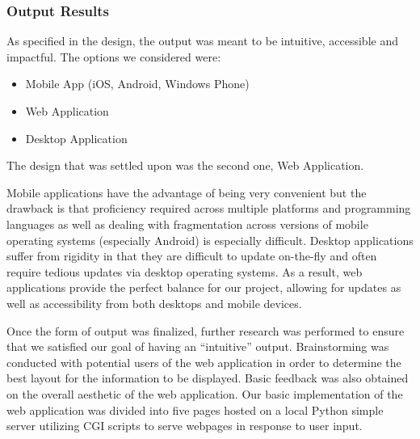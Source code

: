 \subsubsection{Output Results}

As specified in the design, the output was meant to be intuitive,
accessible and impactful. The options we considered were:

\begin{itemize}
    \item Mobile App (iOS, Android, Windows Phone)
    \item Web Application
    \item Desktop Application
\end{itemize}

The design that was settled upon was the second one, Web Application.

Mobile applications have the advantage of being very convenient but
the drawback is that proficiency required across multiple platforms
and programming languages as well as dealing with fragmentation across
versions of mobile operating systems (especially Android) is
especially difficult. Desktop applications suffer from rigidity in
that they are difficult to update on-the-fly and often require tedious
updates via desktop operating systems. As a result, web applications
provide the perfect balance for our project, allowing for updates as
well as accessibility from both desktops and mobile devices.

Once the form of output was finalized, further research was performed
to ensure that we satisfied our goal of having an ``intuitive''
output. Brainstorming was conducted with potential users of the web
application in order to determine the best layout for the information
to be displayed. Basic feedback was also obtained on the overall
aesthetic of the web application. Our basic implementation of the web
application was divided into five pages hosted on a local Python
simple server utilizing CGI scripts to serve webpages in response to
user input.

